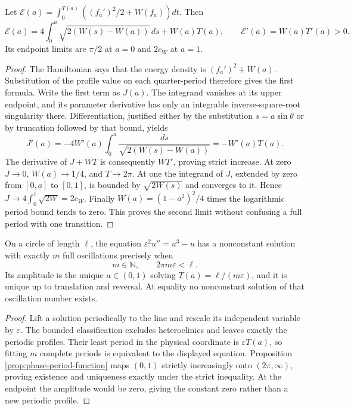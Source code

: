 \begin{proposition}\label{prop:phase-periodic-cell-energy}
Let $\mathcal E(a)=\int_0^{T(a)}((f_a')^2/2+W(f_a))dt$. Then
\[
 \mathcal E(a)=4\int_0^a\sqrt{2(W(s)-W(a))}\,ds+W(a)T(a),
 \qquad \mathcal E'(a)=W(a)T'(a)>0.
\]
Its endpoint limits are $\pi/2$ at $a=0$ and $2c_W$ at $a=1$.
\end{proposition}
\begin{proof}
The Hamiltonian says that the energy density is $(f_a')^2+W(a)$. Substitution of the profile value on each quarter-period therefore gives the first formula. Write the first term as $J(a)$. The integrand vanishes at its upper endpoint, and its parameter derivative has only an integrable inverse-square-root singularity there. Differentiation, justified either by the substitution $s=a\sin\theta$ or by truncation followed by that bound, yields
\[
 J'(a)=-4W'(a)\int_0^a\frac{ds}{\sqrt{2(W(s)-W(a))}}
       =-W'(a)T(a).
\]
The derivative of $J+WT$ is consequently $WT'$, proving strict increase. At zero $J\to0$, $W(a)\to1/4$, and $T\to2\pi$. At one the integrand of $J$, extended by zero from $[0,a]$ to $[0,1]$, is bounded by $\sqrt{2W(s)}$ and converges to it. Hence $J\to4\int_0^1\sqrt{2W}=2c_W$. Finally $W(a)=(1-a^2)^2/4$ times the logarithmic period bound tends to zero. This proves the second limit without confusing a full period with one transition.
\end{proof}

\begin{example}\label{ex:phase-circle-periods}
On a circle of length $\ell$, the equation $\varepsilon^2u''=u^3-u$ has a nonconstant solution with exactly $m$ full oscillations precisely when
\[
 m\in\mathbb N,\qquad 2\pi m\varepsilon<\ell.
\]
Its amplitude is the unique $a\in(0,1)$ solving $T(a)=\ell/(m\varepsilon)$, and it is unique up to translation and reversal. At equality no nonconstant solution of that oscillation number exists.
\end{example}
\begin{proof}
Lift a solution periodically to the line and rescale its independent variable by $\varepsilon$. The bounded classification excludes heteroclinics and leaves exactly the periodic profiles. Their least period in the physical coordinate is $\varepsilon T(a)$, so fitting $m$ complete periods is equivalent to the displayed equation. Proposition \ref{prop:phase-period-function} maps $(0,1)$ strictly increasingly onto $(2\pi,\infty)$, proving existence and uniqueness exactly under the strict inequality. At the endpoint the amplitude would be zero, giving the constant zero rather than a new periodic profile.
\end{proof}


